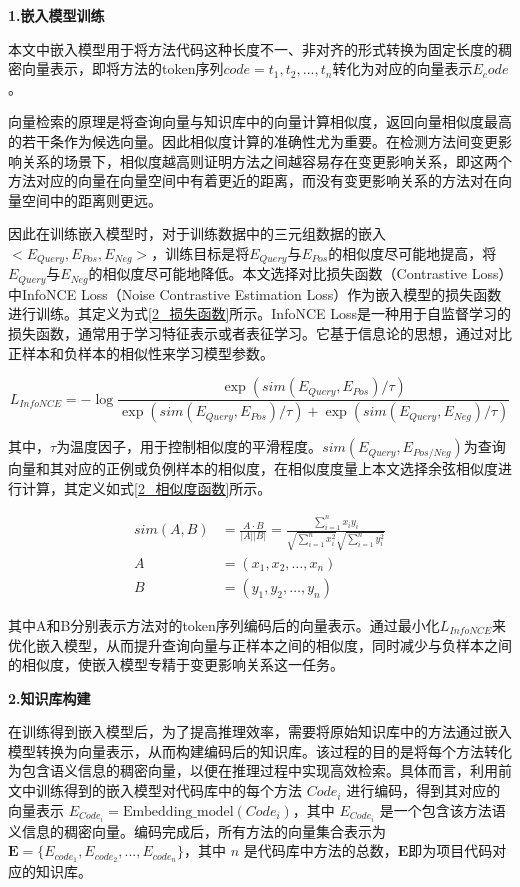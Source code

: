 \noindent \textbf{1.嵌入模型训练}

本文中嵌入模型用于将方法代码这种长度不一、非对齐的形式转换为固定长度的稠密向量表示，即将方法的token序列$code={t_1, t_2, ..., t_n}$转化为对应的向量表示$E_code$。

向量检索的原理是将查询向量与知识库中的向量计算相似度，返回向量相似度最高的若干条作为候选向量。因此相似度计算的准确性尤为重要。在检测方法间变更影响关系的场景下，相似度越高则证明方法之间越容易存在变更影响关系，即这两个方法对应的向量在向量空间中有着更近的距离，而没有变更影响关系的方法对在向量空间中的距离则更远。

因此在训练嵌入模型时，对于训练数据中的三元组数据的嵌入$<E_{Query},E_{Pos},E_{Neg}>$，训练目标是将$E_{Query}$与$E_{Pos}$的相似度尽可能地提高，将$E_{Query}$与$E_{Neg}$的相似度尽可能地降低。本文选择对比损失函数（Contrastive Loss）中InfoNCE Loss（Noise Contrastive Estimation Loss）作为嵌入模型的损失函数进行训练。其定义为式\ref{2_损失函数}所示。InfoNCE Loss是一种用于自监督学习的损失函数，通常用于学习特征表示或者表征学习。它基于信息论的思想，通过对比正样本和负样本的相似性来学习模型参数。

\begin{equation}
    L_{InfoNCE} = -\log\frac{\exp(sim(E_{Query}, E_{Pos}) / \tau)}{\exp(sim(E_{Query}, E_{Pos}) / \tau)+\exp(sim(E_{Query}, E_{Neg}) / \tau)}
    \label{2_损失函数}
\end{equation}


其中，$\tau$为温度因子，用于控制相似度的平滑程度。$sim(E_{Query}, E_{Pos/Neg})$为查询向量和其对应的正例或负例样本的相似度，在相似度度量上本文选择余弦相似度进行计算，其定义如式\ref{2_相似度函数}所示。

\begin{align}
sim(A,B)&=\frac{A\cdot B}{\vert A\vert\vert B\vert}=\frac{\sum_{i = 1}^{n}x_iy_i}{\sqrt{\sum_{i = 1}^{n}x_i^2}\sqrt{\sum_{i = 1}^{n}y_i^2}} \\
A &= (x_1, x_2, \dots, x_n) \\
B &= (y_1, y_2, \dots, y_n)
\label{2_相似度函数}
\end{align}

其中A和B分别表示方法对的token序列编码后的向量表示。通过最小化$L_{InfoNCE}$来优化嵌入模型，从而提升查询向量与正样本之间的相似度，同时减少与负样本之间的相似度，使嵌入模型专精于变更影响关系这一任务。

\noindent \textbf{2.知识库构建}

在训练得到嵌入模型后，为了提高推理效率，需要将原始知识库中的方法通过嵌入模型转换为向量表示，从而构建编码后的知识库。该过程的目的是将每个方法转化为包含语义信息的稠密向量，以便在推理过程中实现高效检索。具体而言，利用前文中训练得到的嵌入模型对代码库中的每个方法 $Code_i$ 进行编码，得到其对应的向量表示 $E_{Code_i} = \text{Embedding\_model}(Code_i)$，其中 $E_{Code_i}$ 是一个包含该方法语义信息的稠密向量。编码完成后，所有方法的向量集合表示为 $\mathbf{E} = \{ E_{code_1}, E_{code_2}, ..., E_{code_n} \}$，其中 $n$ 是代码库中方法的总数，$\mathbf{E}$即为项目代码对应的知识库。


